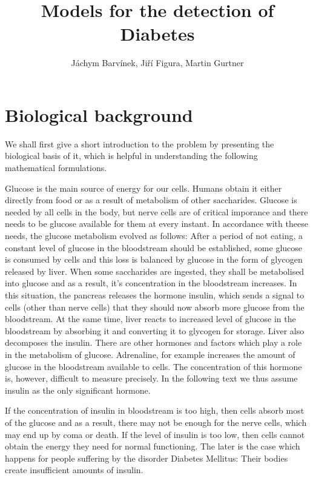 \documentclass{article}
\begin{document}
\title{Models for the detection of Diabetes}
\author{J\'achym Barv\'inek, Ji\v r\'i Figura, Martin Gurtner}

\maketitle

\section{Biological background}
We shall first give a short introduction to the problem by presenting the biological basis of it,
which is helpful in understanding the following mathematical formulations. 

Glucose is the main source of energy for our cells.
Humans obtain it either directly from food or as a result of metabolism of other saccharides. 
Glucose is needed by all cells in the body, but nerve cells are of critical imporance and there needs
to be glucose available for them at every instant. In accordance with theese needs, the glucose
metabolism evolved as follows:
After a period of not eating, a constant level of glucose in the bloodstream should be established,
some glucose is consumed by cells and this loss is balanced by glucose in the form of glycogen
released by liver. When some saccharides are ingested, they shall be metabolised into glucose
and as a result, it's concentration in the bloodstream increases. In this situation, the pancreas
releases the hormone insulin, which sends a signal to cells (other than nerve cells) that they should
now absorb more glucose from the bloodstream. At the same time, liver reacts to increased level of 
glucose in the bloodstream by absorbing it and converting it to glycogen for storage. Liver also 
decomposes the insulin. There are other hormones and factors which play a role in the metabolism
of glucose. Adrenaline, for example increases the amount of glucose in the bloodstream available
to cells. The concentration of this hormone is, however, difficult to measure precisely.
In the following text we thus assume insulin as the only significant hormone.

If the concentration of insulin in bloodstream is too high, then cells absorb most of the glucose 
and as a result, there may not be enough for the nerve cells, which may end up by coma or death.
If the level of insulin is too low, then cells cannot obtain the energy they need for normal functioning.
The later is the case which happens for people suffering by the disorder Diabetes Mellitus: Their bodies
create insufficient amounts of insulin.
\end{document}
